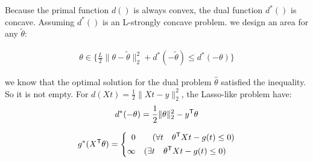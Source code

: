 Because the primal function $d()$ is always convex, the dual function $d^*()$ is concave. Assuming $d^*()$ is an L-strongly concave problem. we design an area for any $\tilde{\theta}$:

\begin{thm}\label{circle}
$$
\begin{aligned}
\theta \in \{\frac{L}{2}\|\theta-\tilde{\theta}\|_2^2+d^*(-\tilde{\theta}) \leq d^*(-\theta)\}
\end{aligned}
$$
\end{thm}
we know that the optimal solution for the dual problem $\hat{\theta}$ satisfied the inequality. So it is not empty.
For $d(Xt) = \frac{1}{2}\|Xt-y\|_2^2$, the Lasso-like problem have: 
$$
\begin{aligned}
d^*(-\theta) = \frac{1}{2}\|\theta\|_2^2-y^{\mathsf T}\theta
\end{aligned}
$$

$$
g^*(X^{\mathsf T}\theta) = \left\{
\begin{aligned}
0 \quad&\quad ( \forall t \quad\theta^{\mathsf T}Xt - g(t) \leq 0 )\\
\infty \quad&( \exists t \quad\theta^{\mathsf T}Xt - g(t) \leq 0 )
\end{aligned}
\right.
$$






















